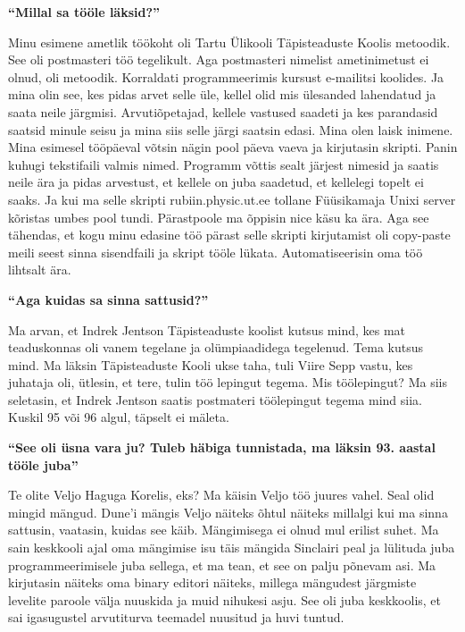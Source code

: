 \textbf{\enquote{Millal sa tööle läksid?}} 	

Minu esimene ametlik töökoht oli Tartu Ülikooli Täpisteaduste Koolis metoodik. See oli postmasteri töö tegelikult. Aga postmasteri nimelist ametinimetust ei olnud, oli metoodik. Korraldati programmeerimis kursust e-mailitsi koolides. Ja mina olin see, kes pidas arvet selle üle, kellel olid mis ülesanded lahendatud ja saata neile järgmisi. Arvutiõpetajad, kellele vastused saadeti ja kes parandasid saatsid minule seisu ja mina siis selle järgi saatsin edasi. Mina olen laisk inimene. Mina esimesel tööpäeval võtsin nägin pool päeva vaeva ja kirjutasin skripti. Panin kuhugi tekstifaili valmis nimed. Programm võttis sealt järjest nimesid ja saatis neile ära ja pidas arvestust, et kellele on juba saadetud, et kellelegi topelt ei saaks. Ja kui ma selle skripti rubiin.physic.ut.ee tollane Füüsikamaja Unixi server kõristas umbes pool tundi. Pärastpoole ma õppisin nice käsu ka ära. Aga see tähendas, et kogu minu edasine töö pärast selle skripti kirjutamist oli copy-paste meili seest sinna sisendfaili ja skript tööle lükata. Automatiseerisin oma töö lihtsalt ära. 

\textbf{\enquote{Aga kuidas sa sinna sattusid?}}

Ma arvan, et Indrek Jentson Täpisteaduste koolist kutsus mind, kes mat teaduskonnas oli vanem tegelane ja olümpiaadidega tegelenud. Tema kutsus mind. Ma läksin Täpisteaduste Kooli ukse taha, tuli Viire Sepp vastu, kes juhataja oli, ütlesin, et tere, tulin töö lepingut tegema. Mis töölepingut? Ma siis seletasin, et Indrek Jentson saatis postmateri töölepingut tegema mind siia. Kuskil 95 või 96 algul, täpselt ei mäleta. 

\textbf{\enquote{See oli üsna vara ju? Tuleb häbiga tunnistada, ma läksin 93. aastal tööle juba}}

Te olite Veljo Haguga Korelis, eks? Ma käisin Veljo töö juures vahel. Seal olid mingid mängud. Dune'i mängis Veljo näiteks õhtul näiteks millalgi kui ma sinna sattusin, vaatasin, kuidas see käib. Mängimisega ei olnud mul erilist suhet. Ma sain keskkooli ajal oma mängimise isu täis mängida Sinclairi peal ja lülituda juba programmeerimisele juba sellega, et ma tean, et see on palju põnevam asi. Ma kirjutasin näiteks oma binary editori näiteks, millega mängudest järgmiste levelite paroole välja nuuskida ja muid nihukesi asju. See oli juba keskkoolis, et sai igasugustel arvutiturva teemadel nuusitud ja huvi tuntud. 

